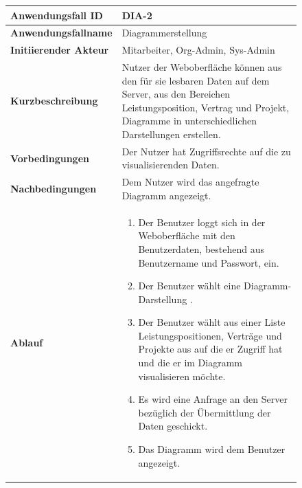 \begin{figure}[h]
	\centering
	\begin{tabularx}{\textwidth}{ X | X }
		\textbf{Anwendungsfall ID} & DIA-2 \\ \hline
		\textbf{Anwendungsfallname} & Diagrammerstellung\\ \hline
		\textbf{Initiierender Akteur} & Mitarbeiter, Org-Admin, Sys-Admin \\ \hline
		\textbf{Kurzbeschreibung} & Nutzer der Weboberfläche können aus den für sie lesbaren Daten auf dem Server, aus den Bereichen Leistungsposition, Vertrag und Projekt, Diagramme in unterschiedlichen Darstellungen erstellen.  \\ \hline
		\textbf{Vorbedingungen} & Der Nutzer hat Zugriffsrechte auf die zu visualisierenden Daten.  \\ \hline
		\textbf{Nachbedingungen} &  Dem Nutzer wird das angefragte Diagramm angezeigt.  \\ \hline
		\textbf{Ablauf} &
		\begin{enumerate}
			\item Der Benutzer loggt sich in der Weboberfläche mit den Benutzerdaten, bestehend aus Benutzername und Passwort, ein.
			\item Der Benutzer wählt eine Diagramm-Darstellung .
			\item Der Benutzer wählt aus einer Liste Leistungspositionen, Verträge und Projekte aus auf die er Zugriff hat und die er im Diagramm visualisieren möchte.
			\item Es wird eine Anfrage an den Server bezüglich der Übermittlung der Daten geschickt.
			\item Das Diagramm wird dem Benutzer angezeigt.
		\end{enumerate} \\ \hline


\end{tabularx}
\end{figure}
